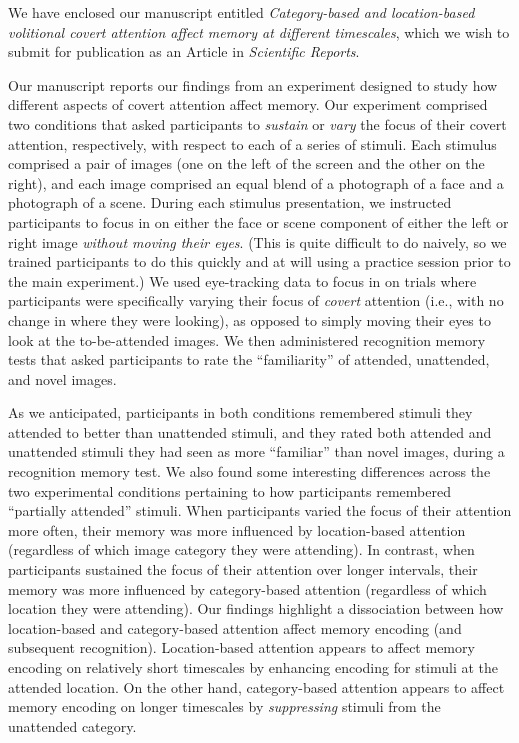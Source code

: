 \documentclass[10pt,stdletter,orderfromtodate,sigleft]{newlfm}
\begin{document}
\begin{newlfm}

We have enclosed our manuscript entitled \textit{Category-based and
location-based volitional covert attention affect memory at different
timescales}, which we wish to submit for publication as an Article in
\textit{Scientific Reports}.

Our manuscript reports our findings from an experiment designed to study how
different aspects of covert attention affect memory. Our experiment comprised
two conditions that asked participants to \textit{sustain} or \textit{vary} the
focus of their covert attention, respectively, with respect to each of a series
of stimuli. Each stimulus comprised a pair of images (one on the left of the
screen and the other on the right), and each image comprised an equal blend of
a photograph of a face and a photograph of a scene. During each stimulus
presentation, we instructed participants to focus in on either the face or
scene component of either the left or right image \textit{without moving their
eyes}. (This is quite difficult to do naively, so we trained participants to do
this quickly and at will using a practice session prior to the main
experiment.) We used eye-tracking data to focus in on trials where participants
were specifically varying their focus of \textit{covert} attention (i.e., with
no change in where they were looking), as opposed to simply moving their eyes
to look at the to-be-attended images. We then administered recognition memory
tests that asked participants to rate the ``familiarity'' of attended,
unattended, and novel images.

As we anticipated, participants in both conditions remembered stimuli they
attended to better than unattended stimuli, and they rated both attended and
unattended stimuli they had seen as more ``familiar'' than novel images, during
a recognition memory test. We also found some interesting differences across
the two experimental conditions pertaining to how participants remembered
``partially attended'' stimuli. When participants varied the focus of their
attention more often, their memory was more influenced by location-based
attention (regardless of which image category they were attending). In
contrast, when participants sustained the focus of their attention over longer
intervals, their memory was more influenced by category-based attention
(regardless of which location they were attending). Our findings highlight a
dissociation between how location-based and category-based attention affect
memory encoding (and subsequent recognition). Location-based attention appears
to affect memory encoding on relatively short timescales by enhancing encoding
for stimuli at the attended location. On the other hand, category-based
attention appears to affect memory encoding on longer timescales by
\textit{suppressing} stimuli from the unattended category.




\end{newlfm}
\end{document}
